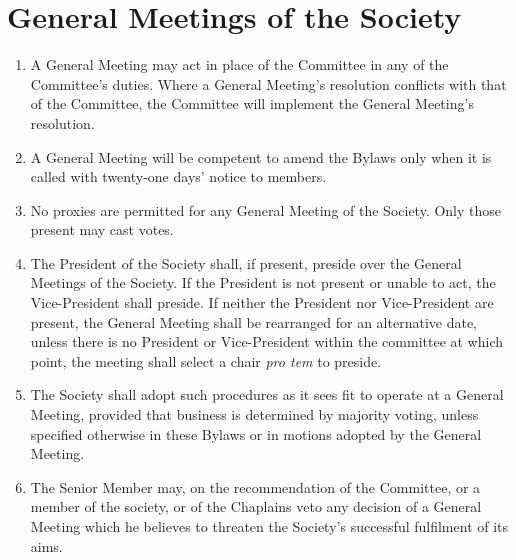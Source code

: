 \documentclass[11pt]{article}
\begin{document}
\section{General Meetings of the Society}
\begin{enumerate}
\item A General Meeting may act in place of the Committee in any of the Committee's duties. Where a General Meeting's resolution conflicts with that of the Committee, the Committee will implement the General Meeting's resolution.
\item A General Meeting will be competent to amend the Bylaws only when it is called with twenty-one days' notice to members.
\item No proxies are permitted for any General Meeting of the Society. Only those present may cast votes.
\item The President of the Society shall, if present, preside over the General Meetings of the Society. If the President is not present or unable to act, the Vice-President shall preside. If neither the President nor Vice-President are present, the General Meeting shall be rearranged for an alternative date, unless there is no President or Vice-President within the committee at which point, the meeting shall select a chair \emph{pro tem} to preside. 
\item The Society shall adopt such procedures as it sees fit to operate at a General Meeting, provided that business is determined by majority voting, unless specified otherwise in these Bylaws or in motions adopted by the General Meeting.
\item The Senior Member may, on the recommendation of the Committee, or a member of the society, or of the Chaplains veto any decision of a General Meeting which he believes to threaten the Society's successful fulfilment of its aims.
\end{enumerate}
\end{document}
